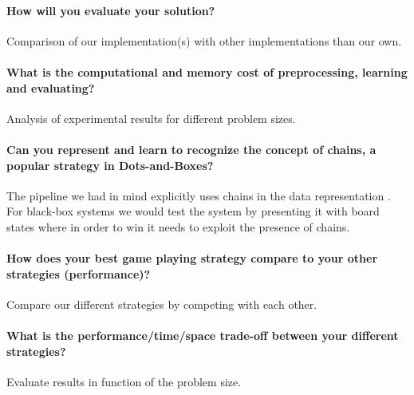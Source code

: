 \documentclass[11pt,a4paper]{article}
\begin{document}
	\paragraph{How will you evaluate your solution?} Comparison of our implementation(s) with other implementations than our own.
	\paragraph{What is the computational and memory cost of preprocessing, learning and evaluating?} Analysis of experimental results for different problem sizes.
	\paragraph{Can you represent and learn to recognize the concept of chains, a popular strategy in Dots-and-Boxes?} The pipeline we had in mind explicitly uses chains in the data representation \cite{7317912}. For black-box systems we would test the system by presenting it with board states where in order to win it needs to exploit the presence of chains.
	\paragraph{How does your best game playing strategy compare to your other strategies (performance)?} Compare our different strategies by competing with each other.
	\paragraph{What is the performance/time/space trade-off between your different strategies?} Evaluate results in function of the problem size.
	
	
	\newpage
	
	
\end{document}
